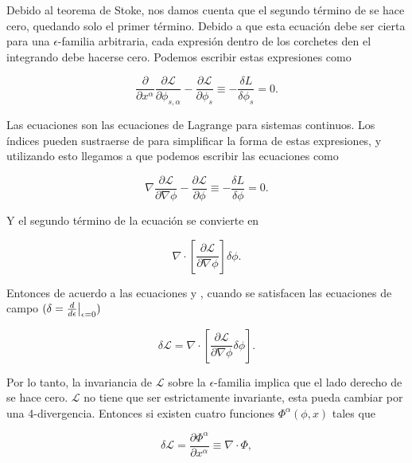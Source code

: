 \documentclass[a4paper,10pt]{article}
\numberwithin{equation}{section}
\newcommand{\zerodel}{.\kern-\nulldelimiterspace}
\begin{document}
Debido al teorema de Stoke, nos damos cuenta que el segundo término de  
se hace cero, quedando solo el primer término. Debido a que esta ecuación debe 
ser cierta para una $\epsilon$-familia arbitraria, cada expresión dentro de los corchetes 
den el integrando debe hacerse cero. Podemos escribir estas expresiones como 

\begin{equation}
 \frac{\partial}{\partial x^\alpha}\frac{\partial \mathcal{L}}{\partial \phi_{s,\alpha}} 
 - \frac{\partial \mathcal{L}}{\partial \phi_s} \equiv - \frac{\delta L}{\delta \phi_s} = 0.
\label{eq:noet4}
\end{equation}

Las ecuaciones  son las ecuaciones de Lagrange para sistemas continuos. 
Los índices pueden sustraerse de para simplificar la forma de estas expresiones, y 
utilizando esto llegamos a que podemos escribir las ecuaciones  como

\begin{equation}
 \nabla \frac{\partial \mathcal{L}}{\partial \nabla \phi} 
 - \frac{\partial \mathcal{L}}{\partial \phi} \equiv - \frac{\delta L}{\delta \phi} = 0.
 \label{eq:noet5}
\end{equation}

Y el segundo término de la ecuación  se convierte en 

\begin{equation}
 \nabla \cdot \left[ \frac{\partial \mathcal{L}}{\partial \nabla \phi}\right] \delta \phi.
 \label{eq:noet6}
\end{equation}

Entonces de acuerdo a las ecuaciones  y , cuando 
se satisfacen las ecuaciones de campo $(\delta = \left\zerodel\frac{d}{d\epsilon}\right|_{\epsilon=0})$

\begin{equation}
 \delta \mathcal{L} =  \nabla \cdot \left[ \frac{\partial \mathcal{L}}{\partial \nabla \phi} \delta \phi\right].
 \label{eq:noet7}
\end{equation}

Por lo tanto, la invariancia de $\mathcal{L}$ sobre la $\epsilon$-familia implica 
que el lado derecho de  se hace cero. $\mathcal{L}$ no tiene que 
ser estrictamente invariante, esta pueda cambiar por una 4-divergencia. Entonces 
si existen cuatro funciones $\Phi^\alpha(\phi,x)$ tales que 

\begin{equation}
 \delta \mathcal{L} = \frac{\partial \Phi^\alpha}{\partial x^\alpha} \equiv \nabla \cdot \Phi,
 \label{eq:noet8}
\end{equation}
\end{document}
